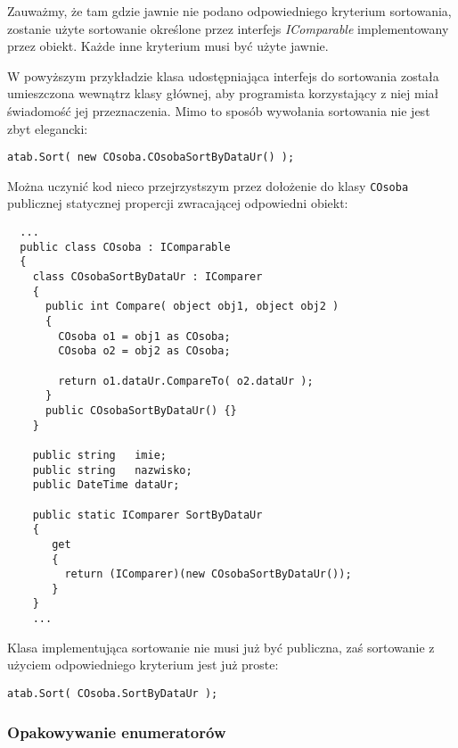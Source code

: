 Zauważmy, że tam gdzie jawnie nie podano odpowiedniego kryterium sortowania, zostanie użyte sortowanie
określone przez interfejs {\em IComparable} implementowany przez obiekt. Każde inne kryterium musi być
użyte jawnie.

W powyższym przykładzie klasa udostępniająca interfejs do sortowania została umieszczona wewnątrz
klasy głównej, aby programista korzystający z niej miał świadomość jej przeznaczenia. Mimo to sposób wywołania
sortowania nie jest zbyt elegancki:

\begin{scriptsize}
\begin{verbatim}
atab.Sort( new COsoba.COsobaSortByDataUr() );
\end{verbatim}
\end{scriptsize}

Można uczynić kod nieco przejrzystszym przez dołożenie do klasy {\tt COsoba} publicznej
statycznej propercji zwracającej odpowiedni obiekt:

\begin{scriptsize}
\begin{verbatim}
  ...
  public class COsoba : IComparable
  {
    class COsobaSortByDataUr : IComparer
    {
      public int Compare( object obj1, object obj2 )
      {
        COsoba o1 = obj1 as COsoba;
        COsoba o2 = obj2 as COsoba;
        
        return o1.dataUr.CompareTo( o2.dataUr );
      }
      public COsobaSortByDataUr() {}
    }

    public string   imie;
    public string   nazwisko;
    public DateTime dataUr;

    public static IComparer SortByDataUr
    {
       get 
       { 
         return (IComparer)(new COsobaSortByDataUr());
       }
    }
    ... 
\end{verbatim}
\end{scriptsize}

Klasa implementująca sortowanie nie musi już być publiczna, zaś sortowanie z użyciem odpowiedniego
kryterium jest już proste:

\begin{scriptsize}
\begin{verbatim}
atab.Sort( COsoba.SortByDataUr );
\end{verbatim}
\end{scriptsize}

\subsubsection{Opakowywanie enumeratorów}

